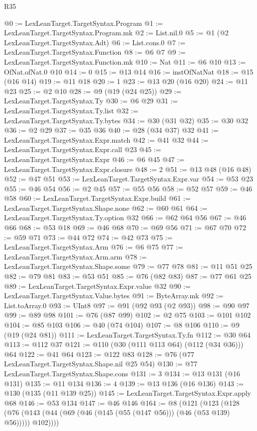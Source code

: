 \begin{lexlean}{R35}
\begin{coremodule}
{{{{{{{@0 := LexLeanTarget.TargetSyntax.Program
@1 := LexLeanTarget.TargetSyntax.Program.mk
@2 := List.nil.{0}
@5 := @1 (@2 LexLeanTarget.TargetSyntax.Adt)
@6 := List.cons.{0}
@7 := LexLeanTarget.TargetSyntax.Function
@8 := @6 @7
@9 := LexLeanTarget.TargetSyntax.Function.mk
@10 := Nat
@11 := @6 @10
@13 := OfNat.ofNat.{0} @10
@14 := 0
@15 := @13 @14
@16 := instOfNatNat
@18 := @15 (@16 @14)
@19 := @11 @18
@20 := 1
@23 := @13 @20 (@16 @20)
@24 := @11 @23
@25 := @2 @10
@28 := @9 (@19 (@24 @25))
@29 := LexLeanTarget.TargetSyntax.Ty
@30 := @6 @29
@31 := LexLeanTarget.TargetSyntax.Ty.list
@32 := LexLeanTarget.TargetSyntax.Ty.bytes
@34 := @30 (@31 @32)
@35 := @30 @32
@36 := @2 @29
@37 := @35 @36
@40 := @28 (@34 @37) @32
@41 := LexLeanTarget.TargetSyntax.Expr.match
@42 := @41 @32
@44 := LexLeanTarget.TargetSyntax.Expr.call @23
@45 := LexLeanTarget.TargetSyntax.Expr
@46 := @6 @45
@47 := LexLeanTarget.TargetSyntax.Expr.closure
@48 := 2
@51 := @13 @48 (@16 @48)
@52 := @47 @51
@53 := LexLeanTarget.TargetSyntax.Expr.var
@54 := @53 @23
@55 := @46 @54
@56 := @2 @45
@57 := @55 @56
@58 := @52 @57
@59 := @46 @58
@60 := LexLeanTarget.TargetSyntax.Expr.build
@61 := LexLeanTarget.TargetSyntax.Shape.none
@62 := @60 @61
@64 := LexLeanTarget.TargetSyntax.Ty.option @32
@66 := @62 @64 @56
@67 := @46 @66
@68 := @53 @18
@69 := @46 @68
@70 := @69 @56
@71 := @67 @70
@72 := @59 @71
@73 := @44 @72
@74 := @42 @73
@75 := LexLeanTarget.TargetSyntax.Arm
@76 := @6 @75
@77 := LexLeanTarget.TargetSyntax.Arm.arm
@78 := LexLeanTarget.TargetSyntax.Shape.some
@79 := @77 @78
@81 := @11 @51 @25
@82 := @79 @81
@83 := @53 @51
@85 := @76 (@82 @83)
@87 := @77 @61 @25
@89 := LexLeanTarget.TargetSyntax.Expr.value @32
@90 := LexLeanTarget.TargetSyntax.Value.bytes
@91 := ByteArray.mk
@92 := List.toArray.{0}
@93 := UInt8
@97 := @91 (@92 @93 (@2 @93))
@98 := @90 @97
@99 := @89 @98
@101 := @76 (@87 @99)
@102 := @2 @75
@103 := @101 @102
@104 := @85 @103
@106 := @40 (@74 @104)
@107 := @8 @106
@110 := @9 (@19 (@24 @81))
@111 := LexLeanTarget.TargetSyntax.Ty.fn
@112 := @30 @64
@113 := @112 @37
@121 := @110 (@30 (@111 @113 @64) (@112 (@34 @36))) @64
@122 := @41 @64
@123 := @122 @83
@128 := @76 (@77 LexLeanTarget.TargetSyntax.Shape.nil @25 @54)
@130 := @77 LexLeanTarget.TargetSyntax.Shape.cons
@131 := 3
@134 := @13 @131 (@16 @131)
@135 := @11 @134
@136 := 4
@139 := @13 @136 (@16 @136)
@143 := @130 (@135 (@11 @139 @25))
@145 := LexLeanTarget.TargetSyntax.Expr.apply @68
@146 := @53 @134
@147 := @46 @146
@164 := @8
    (@121
      (@123
        (@128 (@76 (@143 (@44 (@69 (@46 (@145 (@55 (@147 @56))) (@46 (@53 @139) @56))))) @102))))
}}}}}}}
\end{coremodule}
\end{lexlean}
